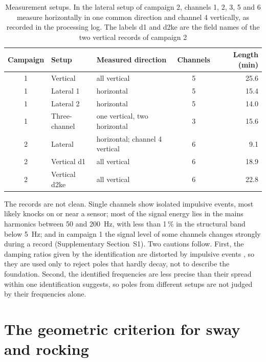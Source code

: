 \documentclass[11pt]{article}
\begin{document}
\begin{table}[htbp]
\centering
\caption{Measurement setups. In the lateral setup of campaign 2, channels 1, 2, 3, 5 and 6 measure horizontally in one common direction and channel 4 vertically, as recorded in the processing log. The labels d1 and d2ke are the field names of the two vertical records of campaign 2}
\label{tab:setups}
\begin{tabular}{@{}cllcr@{}}
\toprule
Campaign & Setup & Measured direction & Channels & Length (min) \\
\midrule
1 & Vertical       & all vertical                   & 5 & 25.6 \\
1 & Lateral 1      & horizontal                     & 5 & 15.4 \\
1 & Lateral 2      & horizontal                     & 5 & 14.0 \\
1 & Three-channel  & one vertical, two horizontal   & 3 & 15.6 \\
2 & Lateral        & horizontal; channel 4 vertical & 6 & 9.1 \\
2 & Vertical d1    & all vertical                   & 6 & 18.9 \\
2 & Vertical d2ke  & all vertical                   & 6 & 22.8 \\
\bottomrule
\end{tabular}
\end{table}

The records are not clean. Single channels show isolated impulsive events, most likely knocks on or near a sensor; most of the signal energy lies in the mains harmonics between 50 and 200~Hz, with less than 1\,\% in the structural band below 5~Hz; and in campaign 1 the signal level of some channels changes strongly during a record (Supplementary Section~S1). Two cautions follow. First, the damping ratios given by the identification are distorted by impulsive events \cite{nord2019}, so they are used only to reject poles that hardly decay, not to describe the foundation. Second, the identified frequencies are less precise than their spread within one identification suggests, so poles from different setups are not judged by their frequencies alone.

\section{The geometric criterion for sway and rocking}
\label{sec:model}
\end{document}
